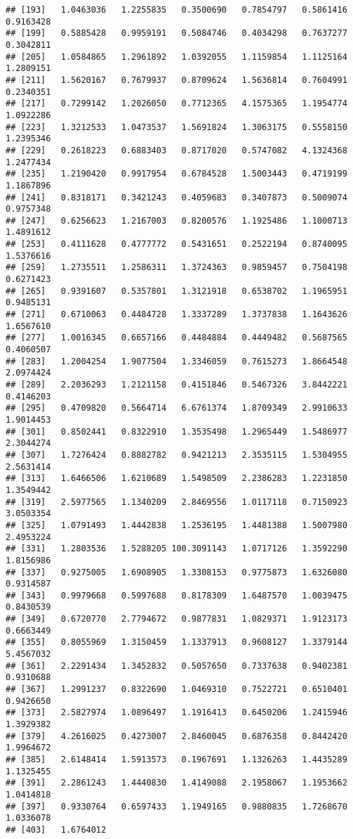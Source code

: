 \documentclass[
]{article}
\begin{document}
\begin{verbatim}
## [193]   1.0463036   1.2255835   0.3500690   0.7854797   0.5861416   0.9163428
## [199]   0.5885428   0.9959191   0.5084746   0.4034298   0.7637277   0.3042811
## [205]   1.0584865   1.2961892   1.0392055   1.1159854   1.1125164   1.2809151
## [211]   1.5620167   0.7679937   0.8709624   1.5636814   0.7604991   0.2340351
## [217]   0.7299142   1.2026050   0.7712365   4.1575365   1.1954774   1.0922286
## [223]   1.3212533   1.0473537   1.5691824   1.3063175   0.5558150   1.2395346
## [229]   0.2618223   0.6883403   0.8717020   0.5747082   4.1324368   1.2477434
## [235]   1.2190420   0.9917954   0.6784528   1.5003443   0.4719199   1.1867896
## [241]   0.8318171   0.3421243   0.4059683   0.3407873   0.5009074   0.9757348
## [247]   0.6256623   1.2167003   0.8200576   1.1925486   1.1000713   1.4891612
## [253]   0.4111628   0.4777772   0.5431651   0.2522194   0.8740095   1.5376616
## [259]   1.2735511   1.2586311   1.3724363   0.9859457   0.7504198   0.6271423
## [265]   0.9391607   0.5357801   1.3121918   0.6538702   1.1965951   0.9485131
## [271]   0.6710063   0.4484728   1.3337289   1.3737838   1.1643626   1.6567610
## [277]   1.0016345   0.6657166   0.4484884   0.4449482   0.5687565   0.4060507
## [283]   1.2004254   1.9077504   1.3346059   0.7615273   1.8664548   2.0974424
## [289]   2.2036293   1.2121158   0.4151846   0.5467326   3.8442221   0.4146203
## [295]   0.4709820   0.5664714   6.6761374   1.8709349   2.9910633   1.9014453
## [301]   0.8502441   0.8322910   1.3535498   1.2965449   1.5486977   2.3044274
## [307]   1.7276424   0.8882782   0.9421213   2.3535115   1.5304955   2.5631414
## [313]   1.6466506   1.6210689   1.5498509   2.2386283   1.2231850   1.3549442
## [319]   2.5977565   1.1340209   2.8469556   1.0117118   0.7150923   3.0503354
## [325]   1.0791493   1.4442838   1.2536195   1.4481388   1.5007980   2.4953224
## [331]   1.2803536   1.5288205 100.3091143   1.0717126   1.3592290   1.8156986
## [337]   0.9275005   1.6908905   1.3308153   0.9775873   1.6326080   0.9314587
## [343]   0.9979668   0.5997688   0.8178309   1.6487570   1.0039475   0.8430539
## [349]   0.6720770   2.7794672   0.9877831   1.0829371   1.9123173   0.6663449
## [355]   0.8055969   1.3150459   1.1337913   0.9608127   1.3379144   5.4567032
## [361]   2.2291434   1.3452832   0.5057650   0.7337638   0.9402381   0.9310688
## [367]   1.2991237   0.8322690   1.0469310   0.7522721   0.6510401   0.9426650
## [373]   2.5827974   1.0896497   1.1916413   0.6450206   1.2415946   1.3929382
## [379]   4.2616025   0.4273007   2.8460045   0.6876358   0.8442420   1.9964672
## [385]   2.6148414   1.5913573   0.1967691   1.1326263   1.4435289   1.1325455
## [391]   2.2861243   1.4440830   1.4149088   2.1958067   1.1953662   1.0414818
## [397]   0.9330764   0.6597433   1.1949165   0.9880835   1.7268670   1.0336078
## [403]   1.6764012
\end{verbatim}
\end{document}
